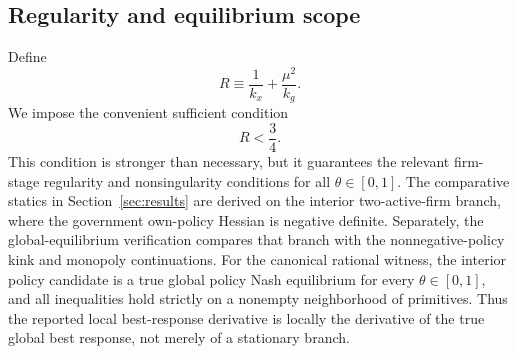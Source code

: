 \subsection{Regularity and equilibrium scope}

Define
\begin{equation}
R\equiv\frac1{k_x}+\frac{\mu^2}{k_g}.
\label{eq:R}
\end{equation}
We impose the convenient sufficient condition
\begin{equation}
R<\frac34.
\label{eq:regularity}
\end{equation}
This condition is stronger than necessary, but it guarantees the relevant firm-stage regularity and nonsingularity conditions for all $\theta\in[0,1]$. The comparative statics in Section~\ref{sec:results} are derived on the interior two-active-firm branch, where the government own-policy Hessian is negative definite. Separately, the global-equilibrium verification compares that branch with the nonnegative-policy kink and monopoly continuations. For the canonical rational witness, the interior policy candidate is a true global policy Nash equilibrium for every $\theta\in[0,1]$, and all inequalities hold strictly on a nonempty neighborhood of primitives. Thus the reported local best-response derivative is locally the derivative of the true global best response, not merely of a stationary branch.